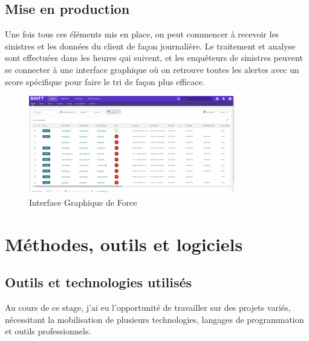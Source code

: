\documentclass [twoside,openright,a4paper,11pt,french] {report}
\begin{document}
\subsection{Mise en production}

Une fois tous ces éléments mis en place, on peut commencer à recevoir les sinistres et les données du client de façon 
journalière. Le traitement et analyse sont effectuées dans les heures qui suivent, et les enquêteurs de sinistres peuvent se connecter 
à une interface graphique où on retrouve toutes les alertes avec un score spécifique pour faire le tri de façon plus efficace. 

\begin{figure}[htbp]
    \centering
    \includegraphics[width=0.80\textwidth]{interfacegraphique.png}
    \caption{Interface  Graphique de Force}
    \label{fig:entonnoir}
\end{figure}





\section{Méthodes, outils et logiciels}
\subsection*{Outils et technologies utilisés}

Au cours de ce stage, j'ai eu l'opportunité de travailler sur des projets variés, nécessitant la mobilisation de plusieurs technologies, langages de programmation et outils professionnels.
\end{document}
